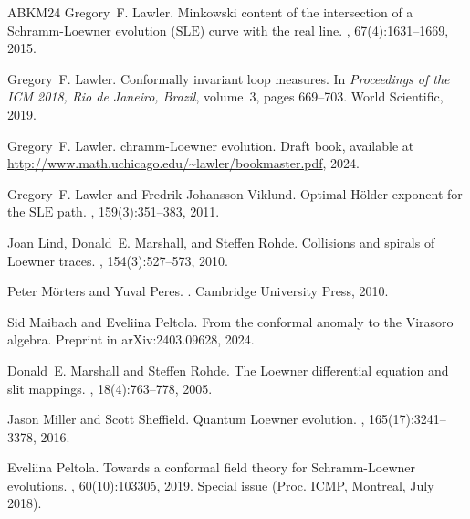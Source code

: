 \documentclass[a4paper, 11pt]{article}
\theoremstyle{definition}
\numberwithin{equation}{section}
\numberwithin{figure}{section}
\begin{document}
\begin{thebibliography}{ABKM24}
Gregory~F. Lawler.
\newblock Minkowski content of the intersection of a {S}chramm-{L}oewner
  evolution ($\mathrm{SLE}$) curve with the real line.
, 67(4):1631--1669, 2015.

Gregory~F. Lawler.
\newblock Conformally invariant loop measures.
\newblock In {\em Proceedings of the ICM 2018, Rio de Janeiro, Brazil},
  volume~3, pages 669--703. World Scientific, 2019.

Gregory~F. Lawler.
chramm-{L}oewner evolution.
\newblock Draft book, available at
  \url{http://www.math.uchicago.edu/~lawler/bookmaster.pdf}, 2024.

Gregory~F. Lawler and Fredrik Johansson-Viklund.
\newblock Optimal {H}{\"o}lder exponent for the $\mathrm{SLE}$ path.
, 159(3):351--383, 2011.

Joan Lind, Donald~E. Marshall, and Steffen Rohde.
\newblock Collisions and spirals of {L}oewner traces.
, 154(3):527--573, 2010.

Peter M{\"orters} and Yuval Peres.
.
\newblock Cambridge University Press, 2010.

Sid Maibach and Eveliina Peltola.
\newblock From the conformal anomaly to the {V}irasoro algebra.
\newblock Preprint in arXiv:2403.09628, 2024.

Donald~E. Marshall and Steffen Rohde.
\newblock The {L}oewner differential equation and slit mappings.
, 18(4):763--778, 2005.

Jason Miller and Scott Sheffield.
\newblock Quantum {L}oewner evolution.
, 165(17):3241--3378, 2016.

Eveliina Peltola.
\newblock Towards a conformal field theory for {S}chramm-{L}oewner evolutions.
, 60(10):103305, 2019.
\newblock Special issue (Proc. ICMP, Montreal, July 2018).



\end{thebibliography}
\end{document}
